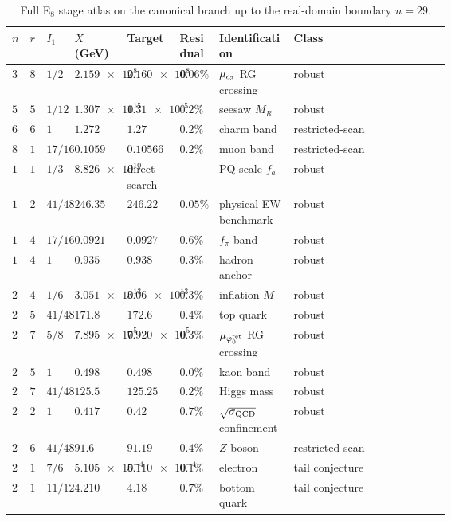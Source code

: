 \begin{table}[H]
\centering
\scriptsize
\setlength{\tabcolsep}{2pt}
\begin{tabularx}{\linewidth}{@{}>{\centering\arraybackslash}p{0.035\linewidth}>{\centering\arraybackslash}p{0.035\linewidth}>{\raggedright\arraybackslash}p{0.065\linewidth}>{\raggedleft\arraybackslash}p{0.12\linewidth}>{\raggedleft\arraybackslash}p{0.12\linewidth}>{\raggedright\arraybackslash}p{0.09\linewidth}>{\raggedright\arraybackslash}p{0.17\linewidth}Y@{}}
\toprule
$n$ & $r$ & $I_1$ & $X$ (GeV) & Target & Residual & Identification & Class \\
\midrule
$3$ & $8$ & $1/2$ & $\num{2.159e8}$ & $\num{2.160e8}$ & $0.06\%$ & $\mu_{c_3}$ RG crossing & robust \\
$5$ & $5$ & $1/12$ & $\num{1.307e15}$ & $\num{1.31e15}$ & $0.2\%$ & seesaw $M_R$ & robust \\
$6$ & $6$ & $1$ & $\num{1.272}$ & $\num{1.27}$ & $0.2\%$ & charm band & restricted-scan \\
$8$ & $1$ & $17/16$ & $\num{0.1059}$ & $\num{0.10566}$ & $0.2\%$ & muon band & restricted-scan \\
$10$ & $1$ & $1/3$ & $\num{8.826e10}$ & direct search & --- & PQ scale $f_a$ & robust \\
$12$ & $2$ & $41/48$ & $\num{246.35}$ & $\num{246.22}$ & $0.05\%$ & physical EW benchmark & robust \\
$14$ & $4$ & $17/16$ & $\num{0.0921}$ & $\num{0.0927}$ & $0.6\%$ & $f_\pi$ band & robust \\
$15$ & $4$ & $1$ & $\num{0.935}$ & $\num{0.938}$ & $0.3\%$ & hadron anchor & robust \\
$21$ & $4$ & $1/6$ & $\num{3.051e13}$ & $\num{3.06e13}$ & $0.3\%$ & inflation $M$ & robust \\
$21$ & $5$ & $41/48$ & $\num{171.8}$ & $\num{172.6}$ & $0.4\%$ & top quark & robust \\
$24$ & $7$ & $5/8$ & $\num{7.895e5}$ & $\num{7.920e5}$ & $0.3\%$ & $\mu_{\varphi_0^{\mathrm{ret}}}$ RG crossing & robust \\
$25$ & $5$ & $1$ & $\num{0.498}$ & $\num{0.498}$ & $0.0\%$ & kaon band & robust \\
$25$ & $7$ & $41/48$ & $\num{125.5}$ & $\num{125.25}$ & $0.2\%$ & Higgs mass & robust \\
$26$ & $2$ & $1$ & $\num{0.417}$ & $\num{0.42}$ & $0.7\%$ & $\sqrt{\sigma_{\mathrm{QCD}}}$ confinement & robust \\
$27$ & $6$ & $41/48$ & $\num{91.6}$ & $\num{91.19}$ & $0.4\%$ & $Z$ boson & restricted-scan \\
$28$ & $1$ & $7/6$ & $\num{5.105e-4}$ & $\num{5.110e-4}$ & $0.1\%$ & electron & tail conjecture \\
$29$ & $1$ & $11/12$ & $\num{4.210}$ & $\num{4.18}$ & $0.7\%$ & bottom quark & tail conjecture \\
\bottomrule
\end{tabularx}
\caption{Full E$_8$ stage atlas on the canonical branch up to the real-domain boundary $n=29$.}
\label{tab:e8-full-atlas}
\end{table}

